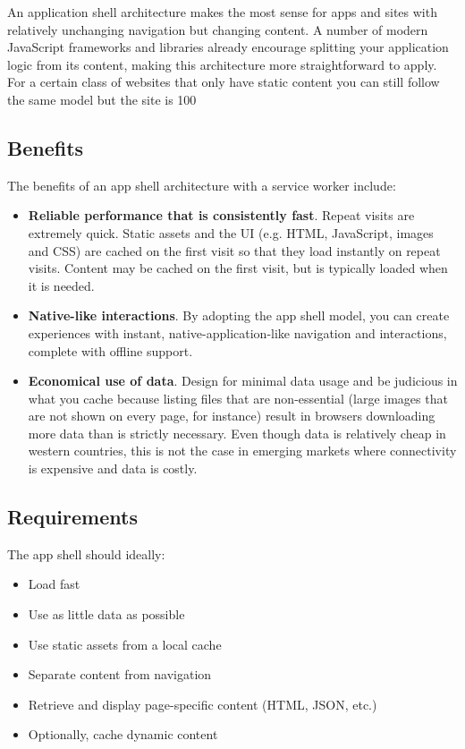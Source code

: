 \documentclass[14pt,a4paper,final]{extreport}
\begin{document}
An application shell architecture makes the most sense for apps and sites with relatively unchanging navigation but changing content. A number of modern JavaScript frameworks and libraries already encourage splitting your application logic from its content, making this architecture more straightforward to apply. For a certain class of websites that only have static content you can still follow the same model but the site is 100%
\subsection{Benefits}
\item

The benefits of an app shell architecture with a service worker include:
\begin{itemize}
    \item \textbf{Reliable performance that is consistently fast}. Repeat visits are extremely quick. Static assets and the UI (e.g. HTML, JavaScript, images and CSS) are cached on the first visit so that they load instantly on repeat visits. Content may be cached on the first visit, but is typically loaded when it is needed.
    \item \textbf{Native-like interactions}. By adopting the app shell model, you can create experiences with instant, native-application-like navigation and interactions, complete with offline support.
    \item \textbf{Economical use of data}. Design for minimal data usage and be judicious in what you cache because listing files that are non-essential (large images that are not shown on every page, for instance) result in browsers downloading more data than is strictly necessary. Even though data is relatively cheap in western countries, this is not the case in emerging markets where connectivity is expensive and data is costly.
\end{itemize}


\subsection{Requirements}
\item The app shell should ideally:
\begin{itemize}
    \item Load fast
    \item Use as little data as possible
    \item Use static assets from a local cache
    \item Separate content from navigation
    \item Retrieve and display page-specific content (HTML, JSON, etc.)
    \item Optionally, cache dynamic content
\end{itemize}
\end{document}
